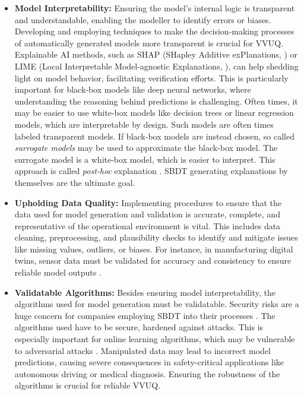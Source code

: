 \begin{itemize}
  \item \textbf{Model Interpretability:} \label{par:surrogate} Ensuring the model's internal logic is transparent and understandable, enabling the modeller to identify errors or biases. Developing and employing techniques to make the decision-making processes of automatically generated models more transparent is crucial for VVUQ. Explainable AI methods, such as SHAP (SHapley Additive exPlanations, \autocite{lundberg2017unified}) or LIME (Local Interpretable Model-agnostic Explanations, \autocite{ribeiro2016should}), can help shedding light on model behavior, facilitating verification efforts. This is particularly important for black-box models like deep neural networks, where understanding the reasoning behind predictions is challenging. Often times, it may be easier to use white-box models like decision trees or linear regression models, which are interpretable by design. Such models are often times labeled transparent models. If black-box models are instead chosen, so called \textit{surrogate models} may be used to approximate the black-box model. The surrogate model is a white-box model, which is easier to interpret. This approach is called \textit{post-hoc} explanation \autocite{fischer2024demystifying}. SBDT generating explanations by themselves are the ultimate goal.
  \item \textbf{Upholding Data Quality:} Implementing procedures to ensure that the data used for model generation and validation is accurate, complete, and representative of the operational environment is vital. This includes data cleaning, preprocessing, and plausibility checks to identify and mitigate issues like missing values, outliers, or biases. For instance, in manufacturing digital twins, sensor data must be validated for accuracy and consistency to ensure reliable model outputs \autocite{rodriguez2023updating}.
  \item \textbf{Validatable Algorithms:} Besides ensuring model interpretability, the algorithms used for model generation must be validatable. Security risks are a huge concern for companies employing SBDT into their processes \autocite{alcaraz2022digital}. The algorithms used have to be secure, hardened against attacks. This is especially important for online learning algorithms, which may be vulnerable to adversarial attacks \autocite{balta2023digital}. Manipulated data may lead to incorrect model predictions, causing severe consequences in safety-critical applications like autonomous driving or medical diagnosis. Ensuring the robustness of the algorithms is crucial for reliable VVUQ.

\end{itemize}

